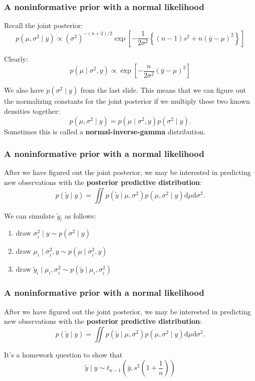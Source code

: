 \documentclass{beamer}
\begin{document}
\begin{frame}
\frametitle{A noninformative prior with a normal likelihood}

Recall the joint posterior:
\[
p(\mu, \sigma^2 \mid y) \propto (\sigma^2)^{-(n+2)/2}\exp\left[ - \frac{1}{2\sigma^2}\left\{(n-1)  s^2 + n(\bar{y} - \mu)^2 \right\} \right]
\]

Clearly:
\[
p(\mu \mid \sigma^2, y) \propto \exp\left[ - \frac{n}{2\sigma^2} (\bar{y} - \mu)^2  \right]
\]
\pause

We also have $p(\sigma^2 \mid y)$ from the last slide. This means that we can figure out the normalizing constants for the joint posterior if we multiply these two known densities together:
\[
p(\mu, \sigma^2 \mid y) = p(\mu \mid \sigma^2,y) p(\sigma^2 \mid y).
\]
Sometimes this is called a {\bf normal-inverse-gamma} distribution.

\end{frame}

\begin{frame}
\frametitle{A noninformative prior with a normal likelihood}

After we have figured out the joint posterior, we may be interested in predicting new observations with the {\bf posterior predictive distribution}:
\[
p(\tilde{y} \mid y) = \iint p(\tilde{y} \mid \mu, \sigma^2) p(\mu, \sigma^2 \mid y) \text{d} \mu \text{d} \sigma^2.
\]
\pause

We can simulate $\tilde{y}_i$ as follows:
\begin{enumerate}
\item draw $\sigma^2_i \mid y \sim p(\sigma^2 \mid y)$
\item draw $\mu_i \mid \sigma^2_i, y \sim p(\mu \mid \sigma^2_i, y)$
\item draw $\tilde{y}_i \mid \mu_i, \sigma^2_i \sim p(\tilde{y} \mid \mu_i, \sigma^2_i)$
\end{enumerate}


\end{frame}
\begin{frame}
\frametitle{A noninformative prior with a normal likelihood}

After we have figured out the joint posterior, we may be interested in predicting new observations with the {\bf posterior predictive distribution}:
\[
p(\tilde{y} \mid y) = \iint p(\tilde{y} \mid \mu, \sigma^2) p(\mu, \sigma^2 \mid y) \text{d} \mu \text{d} \sigma^2.
\]
\pause

It's a homework question to show that 
\[
\tilde{y} \mid y \sim t_{n-1}\left(\bar{y}, s^2\left(1 + \frac{1}{n} \right) \right)
\]

\end{frame}
\end{document}
